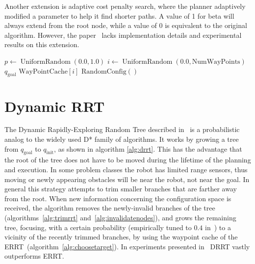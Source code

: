 Another extension is adaptive cost penalty search, where the planner adaptively
modified a parameter to help it find shorter paths. A value of 1 for beta will
always extend from the root node, while a value of 0 is equivalent to the
original algorithm. However, the paper~\cite{Bruce02} lacks
implementation details and experimental results on this extension.

\begin{algorithm}[ht!]
    \caption{$\operatorname{ChooseTarget}(q,{\text{goal}})$}
    \label{alg:choosetarget}
    \begin{algorithmic}[1]
        \STATE \(p \leftarrow \operatorname{UniformRandom}(0.0,1.0)\)
        \STATE \(i \leftarrow \operatorname{UniformRandom}(0.0,\text{NumWayPoints})\)
            \RETURN \(q_{\text{goal}}\)
            \RETURN \(\text{WayPointCache}[i]\)
            \RETURN \(\text{RandomConfig}()\)
        \ENDIF
    \end{algorithmic}
\end{algorithm}

\section{Dynamic RRT}
\label{sec:DRRT}
The Dynamic Rapidly-Exploring Random Tree described in~\cite{Ferguson06} is a
probabilistic analog to the widely used D* family of algorithms. It works by
growing a tree from \(q_{\text{goal}}\) to \(q_{\text{init}}\), as shown in algorithm
\ref{alg:drrt}. This has the advantage that the
root of the tree does not have to be moved during the lifetime of the planning
and execution. In some problem classes the robot has limited range
sensors, thus moving or newly appearing obstacles will be near the robot, not
near the goal. In general this strategy attempts to trim smaller branches that are
farther away from the root. When new information concerning the configuration space is
received, the algorithm removes the newly-invalid branches of the
tree (algorithms~\ref{alg:trimrrt} and~\ref{alg:invalidatenodes}), and
grows the remaining tree, focusing, with a certain probability (empirically tuned
to $0.4$ in~\cite{Ferguson06}) to a vicinity of the recently trimmed branches,
by using the waypoint
cache of the ERRT~(algorithm~\ref{alg:choosetarget}). In experiments presented
in~\cite{Ferguson06} DRRT vastly outperforms ERRT.

